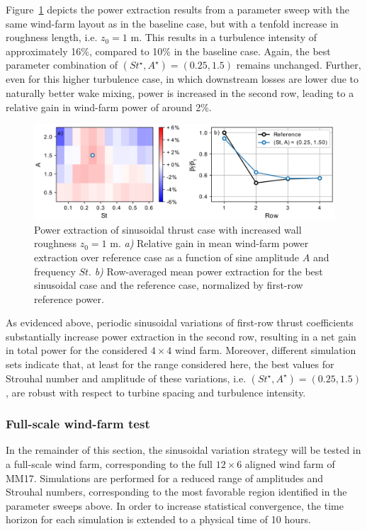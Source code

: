 \documentclass[wes, manuscript]{copernicus}
\begin{document}
Figure~\ref{fig:sinus_roughness} depicts the power extraction results from a parameter sweep with the same wind-farm layout as in the baseline case, but with a tenfold increase in roughness length, i.e. $z_0 = 1$ m. This results in a turbulence intensity of approximately 16\%, compared to 10\% in the baseline case. Again, the best parameter combination of $(St^\star, A^\star) = (0.25, 1.5)$ remains unchanged. Further, even for this higher turbulence case, in which downstream losses are lower due to naturally better wake mixing, power is increased in the second row, leading to a relative gain in wind-farm power of around 2\%. 
\begin{figure}
	\centering
	\includegraphics[width=\textwidth]{gains_turbulent_6D_6D_6D_wide_antiphase_z0_1m2.eps}
	\caption{Power extraction of sinusoidal thrust case with increased wall roughness $z_0 = 1$ m. \emph{a) } Relative gain in mean wind-farm power extraction over reference case as a function of sine amplitude $A$ and frequency $St$. \emph{b) } Row-averaged mean power extraction for the best sinusoidal case and the reference case, normalized by first-row reference power.\label{fig:sinus_roughness} }
\end{figure}


As evidenced above, periodic sinusoidal variations of first-row thrust coefficients substantially increase power extraction in the second row, resulting in a net gain in total power for the considered $4\times4$ wind farm. Moreover, different simulation sets indicate that, at least for the range considered here, the best values for Strouhal number and amplitude of these variations, i.e. $(St^\star, A^\star) = (0.25, 1.5)$, are robust with respect to turbine spacing and turbulence intensity. 

\subsubsection{Full-scale wind-farm test}
In the remainder of this section, the sinusoidal variation strategy will be tested in a full-scale wind farm, corresponding to the full $12 \times 6$ aligned wind farm of MM17. Simulations are performed for a reduced range of amplitudes and Strouhal numbers, corresponding to the most favorable region identified in the parameter sweeps above. In order to increase statistical convergence, the time horizon for each simulation is extended to a physical time of 10 hours. 
\end{document}
